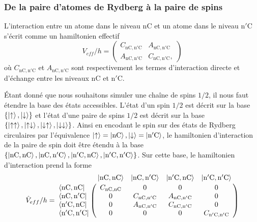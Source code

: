 \subsubsection*{De la paire d'atomes de Rydberg à la paire de spins}
\noindent L'interaction entre un atome dans le niveau $\mathrm{nC}$ et un atome dans le niveau $\mathrm{n'C}$ s'écrit comme un hamiltonien effectif
\begin{equation}
\label{eq:Veff_nCn'C}
V_{eff}/h = \left(\begin{array}{cc}
C_{\mathrm{nC},\mathrm{n'C}} & A_{\mathrm{nC},\mathrm{n'C}} \\
A_{\mathrm{nC},\mathrm{n'C}} & C_{\mathrm{nC},\mathrm{n'C}},
\end{array} \right)
\end{equation}
où $C_{\mathrm{nC},\mathrm{n'C}}$ et $A_{\mathrm{nC},\mathrm{n'C}}$ sont respectivement les termes d'interaction directe et d'échange entre les niveaux $\mathrm{nC}$ et $\mathrm{n'C}$.

Étant donné que nous souhaitons simuler une chaîne de spins $1/2$, il nous faut étendre la base des états accessibles.
L'état d'un spin $1/2$ est décrit sur la base $\{\ket{\uparrow},\ket{\downarrow}\}$ et l'état d'une paire de spins $1/2$ est décrit sur la base $\{ \ket{\uparrow \uparrow},\ket{\uparrow \downarrow}, \ket{\downarrow\uparrow}, \ket{\downarrow\downarrow} \}$.
Ainsi en encodant le spin sur des états de Rydberg circulaires par l'équivalence $\ket{\uparrow} = \ket{\mathrm{nC}} , \ket{\downarrow} = \ket{\mathrm{n'C}}$, le hamiltonien d'interaction de la paire de spin doit être étendu à la base 
$\{ \ket{\mathrm{nC},\mathrm{nC}},\ket{\mathrm{nC},\mathrm{n'C}}, \ket{\mathrm{n'C},\mathrm{nC}}, \ket{\mathrm{n'C},\mathrm{n'C}} \}$.
Sur cette base, le hamiltonien d'interaction prend la forme
\begin{equation}
\label{eq:V_eff_nCnC_n'Cn'c}
\hat{V}_{eff}/h = \bordermatrix{
~ 	&\ket{\mathrm{nC},\mathrm{nC}} 	&\ket{\mathrm{nC},\mathrm{n'C}} 
&\ket{\mathrm{n'C},\mathrm{nC}} &\ket{\mathrm{n'C},\mathrm{n'C}} \cr
	\bra{\mathrm{nC},\mathrm{nC}}	& C_{\mathrm{nC},\mathrm{nC}} & 0 & 0 & 0 \cr 
	\bra{\mathrm{nC},\mathrm{n'C}} 	& 0 & C_{\mathrm{nC},\mathrm{n'C}} & A_{\mathrm{nC},\mathrm{n'C}} & 0 \cr
	\bra{\mathrm{n'C},\mathrm{nC}} 	& 0 & A_{\mathrm{nC},\mathrm{n'C}} & C_{\mathrm{nC},\mathrm{n'C}} & 0 \cr
	\bra{\mathrm{n'C},\mathrm{n'C}} & 0 & 0 &  0	& C_{\mathrm{n'C},\mathrm{n'C}}\cr
	}
\end{equation}


